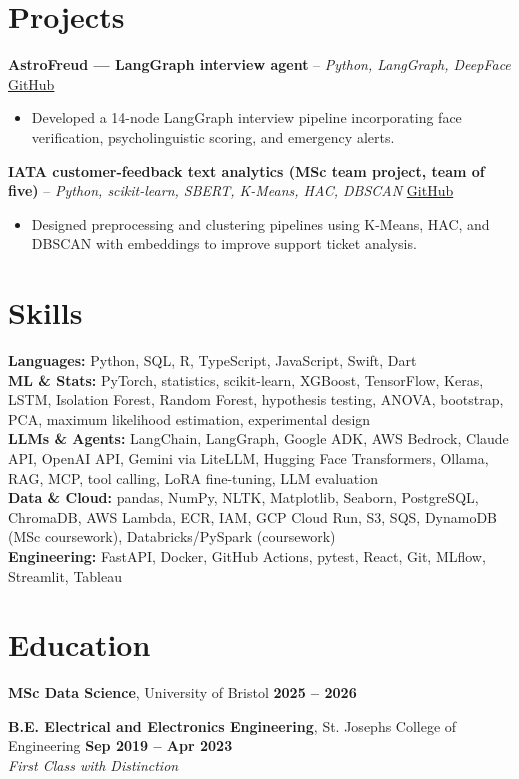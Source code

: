\documentclass[a4paper,10pt]{article}
\begin{document}
\section{Projects}
\noindent\textbf{AstroFreud — LangGraph interview agent} -- \textit{Python, LangGraph, DeepFace} \hfill \href{https://github.com/Thiruvel-AP/AstroFreud}{GitHub}
\begin{itemize}
  \item Developed a 14-node LangGraph interview pipeline incorporating face verification, psycholinguistic scoring, and emergency alerts.
\end{itemize}
\noindent\textbf{IATA customer-feedback text analytics (MSc team project, team of five)} -- \textit{Python, scikit-learn, SBERT, K-Means, HAC, DBSCAN} \hfill \href{https://github.com/Thiruvel-AP/TextAnalytics}{GitHub}
\begin{itemize}
  \item Designed preprocessing and clustering pipelines using K-Means, HAC, and DBSCAN with embeddings to improve support ticket analysis.
\end{itemize}

\section{Skills}
\textbf{Languages:} Python, SQL, R, TypeScript, JavaScript, Swift, Dart\\
\textbf{ML \& Stats:} PyTorch, statistics, scikit-learn, XGBoost, TensorFlow, Keras, LSTM, Isolation Forest, Random Forest, hypothesis testing, ANOVA, bootstrap, PCA, maximum likelihood estimation, experimental design\\
\textbf{LLMs \& Agents:} LangChain, LangGraph, Google ADK, AWS Bedrock, Claude API, OpenAI API, Gemini via LiteLLM, Hugging Face Transformers, Ollama, RAG, MCP, tool calling, LoRA fine-tuning, LLM evaluation\\
\textbf{Data \& Cloud:} pandas, NumPy, NLTK, Matplotlib, Seaborn, PostgreSQL, ChromaDB, AWS Lambda, ECR, IAM, GCP Cloud Run, S3, SQS, DynamoDB (MSc coursework), Databricks/PySpark (coursework)\\
\textbf{Engineering:} FastAPI, Docker, GitHub Actions, pytest, React, Git, MLflow, Streamlit, Tableau

\section{Education}
\textbf{MSc Data Science}, University of Bristol \hfill \textbf{2025 – 2026}\par
\vspace{2pt}
\textbf{B.E. Electrical and Electronics Engineering}, St. Joseph\textquotesingle{}s College of Engineering \hfill \textbf{Sep 2019 – Apr 2023}\\ \textit{First Class with Distinction}\par
\end{document}

